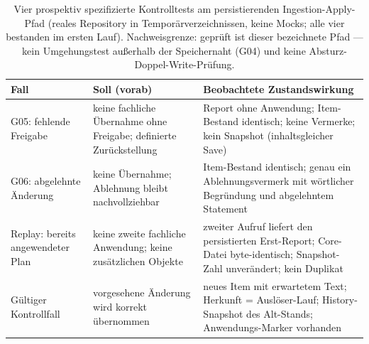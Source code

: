 
\begin{table}[htbp]
  \centering
  \small
  \begin{tabular}{>{\raggedright\arraybackslash}p{}>{\raggedright\arraybackslash}p{}>{\raggedright\arraybackslash}p{}}
    \hline
    \textbf{Fall} & \textbf{Soll (vorab)} & \textbf{Beobachtete Zustandswirkung} \\
    \hline
    G05: fehlende Freigabe & keine fachliche Übernahme ohne Freigabe; definierte Zurückstellung & Report ohne Anwendung; Item-Bestand identisch; keine Vermerke; kein Snapshot (inhaltsgleicher Save) \\
    G06: abgelehnte Änderung & keine Übernahme; Ablehnung bleibt nachvollziehbar & Item-Bestand identisch; genau ein Ablehnungsvermerk mit wörtlicher Begründung und abgelehntem Statement \\
    Replay: bereits angewendeter Plan & keine zweite fachliche Anwendung; keine zusätzlichen Objekte & zweiter Aufruf liefert den persistierten Erst-Report; Core-Datei byte-identisch; Snapshot-Zahl unverändert; kein Duplikat \\
    Gültiger Kontrollfall & vorgesehene Änderung wird korrekt übernommen & neues Item mit erwartetem Text; Herkunft = Auslöser-Lauf; History-Snapshot des Alt-Stands; Anwendungs-Marker vorhanden \\
    \hline
  \end{tabular}
  \caption[Kontrolltests am persistierenden Ingestion-Apply-Pfad]{Vier prospektiv spezifizierte Kontrolltests am
    persistierenden Ingestion-Apply-Pfad (reales Repository in
    Temporärverzeichnissen, keine Mocks; alle vier bestanden im
    ersten Lauf). Nachweisgrenze: geprüft ist dieser bezeichnete
    Pfad --- kein Umgehungstest außerhalb der Speichernaht (G04)
    und keine Absturz-Doppel-Write-Prüfung.}
  \label{t:eval-kontrolltests}
\end{table}
